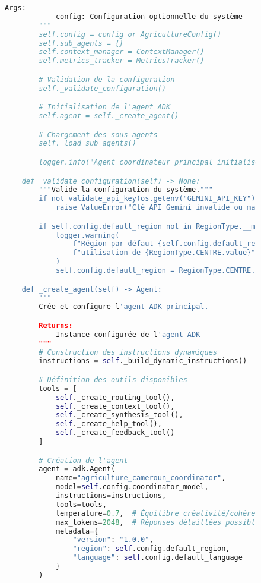 \begin{figure}[h]
\begin{lstlisting}[language=Python, caption=Structure complète de l'agent principal]
        Args:
            config: Configuration optionnelle du système
        """
        self.config = config or AgricultureConfig()
        self.sub_agents = {}
        self.context_manager = ContextManager()
        self.metrics_tracker = MetricsTracker()

        # Validation de la configuration
        self._validate_configuration()

        # Initialisation de l'agent ADK
        self.agent = self._create_agent()

        # Chargement des sous-agents
        self._load_sub_agents()

        logger.info("Agent coordinateur principal initialisé avec succès")

    def _validate_configuration(self) -> None:
        """Valide la configuration du système."""
        if not validate_api_key(os.getenv("GEMINI_API_KEY")):
            raise ValueError("Clé API Gemini invalide ou manquante")

        if self.config.default_region not in RegionType.__members__:
            logger.warning(
                f"Région par défaut {self.config.default_region} invalide, "
                f"utilisation de {RegionType.CENTRE.value}"
            )
            self.config.default_region = RegionType.CENTRE.value

    def _create_agent(self) -> Agent:
        """
        Crée et configure l'agent ADK principal.

        Returns:
            Instance configurée de l'agent ADK
        """
        # Construction des instructions dynamiques
        instructions = self._build_dynamic_instructions()

        # Définition des outils disponibles
        tools = [
            self._create_routing_tool(),
            self._create_context_tool(),
            self._create_synthesis_tool(),
            self._create_help_tool(),
            self._create_feedback_tool()
        ]

        # Création de l'agent
        agent = adk.Agent(
            name="agriculture_cameroun_coordinator",
            model=self.config.coordinator_model,
            instructions=instructions,
            tools=tools,
            temperature=0.7,  # Équilibre créativité/cohérence
            max_tokens=2048,  # Réponses détaillées possibles
            metadata={
                "version": "1.0.0",
                "region": self.config.default_region,
                "language": self.config.default_language
            }
        )


\end{lstlisting}
\end{figure}
